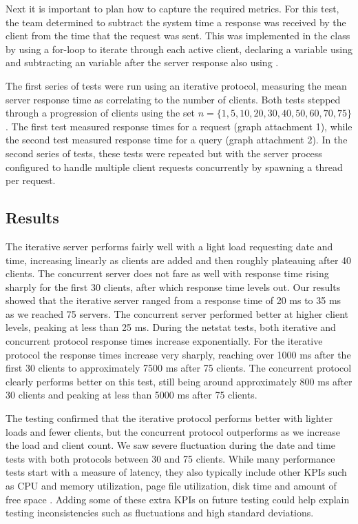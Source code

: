 Next it is important to plan how to capture the required metrics. For this test, the team determined to subtract the system time a response was received by the client from the time that the request was sent. This was implemented in the class  by using a for-loop to iterate through each active client, declaring a  variable using  and subtracting an  variable after the server response also using . 

The first series of tests were run using an iterative protocol, measuring the mean server response time as correlating to the number of clients. Both tests stepped through a progression of clients  using the set  $n = \{1, 5, 10, 20, 30, 40, 50, 60, 70, 75\}$.  
The first test measured response times for a  request (graph attachment 1), while the second test measured response time for a  query (graph attachment 2). 
In the second series of tests, these tests were repeated but with the server process configured to handle multiple client requests concurrently by spawning a thread per request.

\subsection{Results}

The iterative server performs fairly well with a light load requesting date and time, increasing linearly as clients are added and then roughly plateauing after 40 clients. 
The concurrent server does not fare as well with response time rising sharply for the first 30 clients, after which response time levels out. 
Our results showed that the iterative server ranged from a response time of 20 ms to 35 ms as we reached 75 servers.
The concurrent server performed better at higher client levels, peaking at less than 25 ms. 
During the netstat tests, both iterative and concurrent protocol response times increase exponentially. 
For the iterative protocol the response times increase very sharply, reaching over 1000 ms after the first 30 clients to approximately 7500 ms after 75 clients. 
The concurrent protocol clearly performs better on this test, still being around approximately 800 ms after 30 clients and peaking at less than 5000 ms after 75 clients. 

The testing confirmed that the iterative protocol performs better with lighter loads and fewer clients, but the concurrent protocol outperforms as we increase the load and client count.
We saw severe fluctuation during the date and time tests with both protocols between 30 and 75 clients. 
While many performance tests start with a measure of latency, they also typically include other KPIs such as CPU and memory utilization, page file utilization, disk time and amount of free space
\cite{molyneaux}.
Adding some of these extra KPIs on future testing could help explain testing inconsistencies such as fluctuations and high standard deviations.
